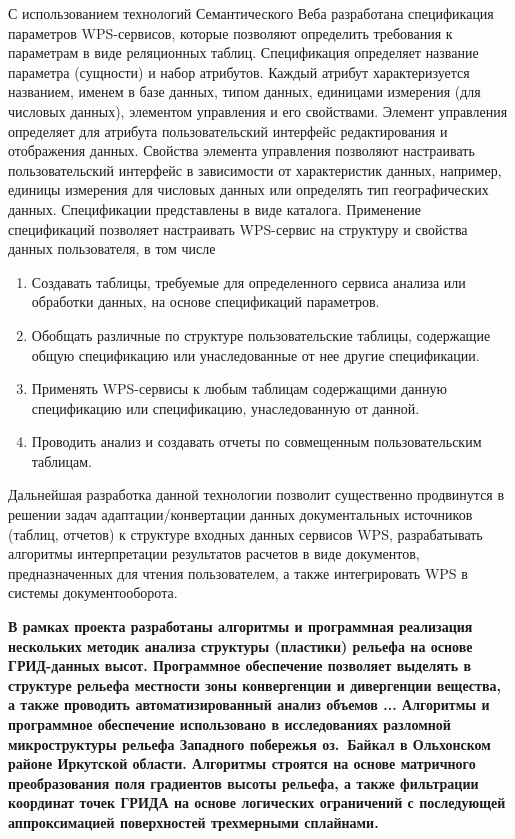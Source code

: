 \documentclass[12pt,a4paper]{ltxdoc}
\begin{document}
С использованием технологий Семантического Веба разработана спецификация параметров WPS-сервисов, которые позволяют определить требования к параметрам в виде реляционных таблиц.  Спецификация определяет название параметра (сущности) и набор атрибутов. Каждый атрибут характеризуется названием, именем в базе данных, типом данных, единицами измерения (для числовых данных), элементом управления и его свойствами. Элемент управления определяет для атрибута пользовательский интерфейс редактирования и отображения данных. Свойства элемента управления позволяют настраивать пользовательский интерфейс в зависимости от характеристик данных, например, единицы измерения для числовых данных или определять тип географических данных. Спецификации представлены в виде каталога. Применение спецификаций позволяет настраивать WPS-сервис на структуру и свойства данных пользователя, в том числе
\begin{enumerate}
\item Создавать таблицы, требуемые для определенного сервиса анализа или обработки данных, на основе спецификаций параметров.
\item Обобщать различные по структуре пользовательские таблицы, содержащие общую спецификацию или унаследованные от нее другие спецификации.
\item Применять WPS-сервисы к любым таблицам содержащими данную спецификацию или спецификацию, унаследованную от данной.
\item Проводить анализ и создавать отчеты по совмещенным пользовательским таблицам.
\end{enumerate}

Дальнейшая разработка данной технологии позволит существенно продвинутся в решении задач адаптации/конвертации данных документальных источников (таблиц, отчетов) к структуре входных данных сервисов WPS, разрабатывать алгоритмы интерпретации результатов расчетов в виде документов, предназначенных для чтения пользователем, а также интегрировать WPS в системы документооборота.

{\bfseries
В рамках проекта разработаны алгоритмы и программная реализация нескольких методик анализа структуры (пластики) рельефа на основе ГРИД-данных высот. Программное обеспечение позволяет выделять в структуре рельефа местности зоны конвергенции и дивергенции вещества, а также проводить автоматизированный анализ объемов ... Алгоритмы и программное обеспечение использовано в исследованиях разломной микроструктуры рельефа Западного побережья оз.~Байкал в Ольхонском районе Иркутской области. Алгоритмы строятся на основе матричного преобразования поля градиентов высоты рельефа, а также фильтрации координат точек ГРИДА на основе логических ограничений с последующей аппроксимацией поверхностей трехмерными сплайнами.
}
\end{document}
